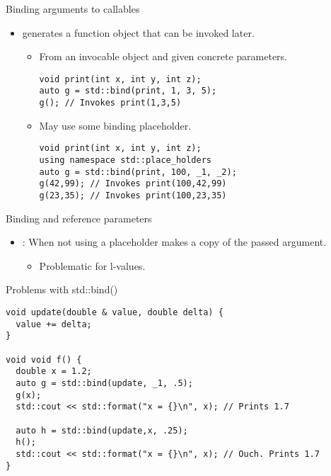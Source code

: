 \begin{frame}[t,fragile]{Binding arguments to callables}
\begin{itemize}
  \item {} generates a function object that can be invoked later.

    \begin{itemize}
      \item From an invocable object and given concrete parameters.
\begin{lstlisting}
void print(int x, int y, int z);
auto g = std::bind(print, 1, 3, 5);
g(); // Invokes print(1,3,5)
\end{lstlisting}

      \item May use some binding placeholder.
\begin{lstlisting}
void print(int x, int y, int z);
using namespace std::place_holders
auto g = std::bind(print, 100, _1, _2);
g(42,99); // Invokes print(100,42,99)
g(23,35); // Invokes print(100,23,35)
\end{lstlisting}
    \end{itemize}
\end{itemize}
\end{frame}

\begin{frame}[t,fragile]{Binding and reference parameters}
\begin{itemize}
  \item {}: When not using a placeholder  makes a copy
        of the passed argument.
    \begin{itemize}
      \item Problematic for l-values.
    \end{itemize}
\end{itemize}

\begin{block}{Problems with std::bind()}
\begin{lstlisting}[basicstyle=\mode<presentation>{\tiny}]
void update(double & value, double delta) {
  value += delta;
}

void void f() {
  double x = 1.2; 
  auto g = std::bind(update, _1, .5);
  g(x);
  std::cout << std::format("x = {}\n", x); // Prints 1.7

  auto h = std::bind(update,x, .25);
  h();
  std::cout << std::format("x = {}\n", x); // Ouch. Prints 1.7
}
\end{lstlisting}
\end{block}
\end{frame}

